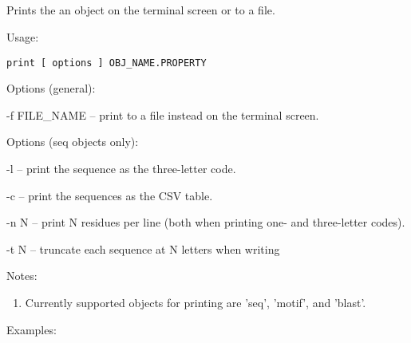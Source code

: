 


\subsection[print]{  }



Prints the an object on the terminal screen or to a file.


\begin{description}


\item{Usage:}

{\tt print [ options ] OBJ\_NAME.PROPERTY}


\item{Options (general):}
\begin{description}
\item -f FILE\_NAME -- print to a file instead on the terminal screen.
\end{description}

\item{Options (seq objects only):}
\begin{description}
\item -l -- print the sequence as the three-letter code.
\item -c -- print the sequences as the CSV table.
\item -n N -- print N residues per line (both when printing one- and
 three-letter codes).
\item -t N -- truncate each sequence at N letters when writing
\end{description}


\item{Notes:}
\begin{enumerate}
\item Currently supported objects for printing are 'seq', 'motif',
and 'blast'. 
\end{enumerate}


\item{Examples:}
\begin{enumerate}


\end{enumerate}
\end{description}
